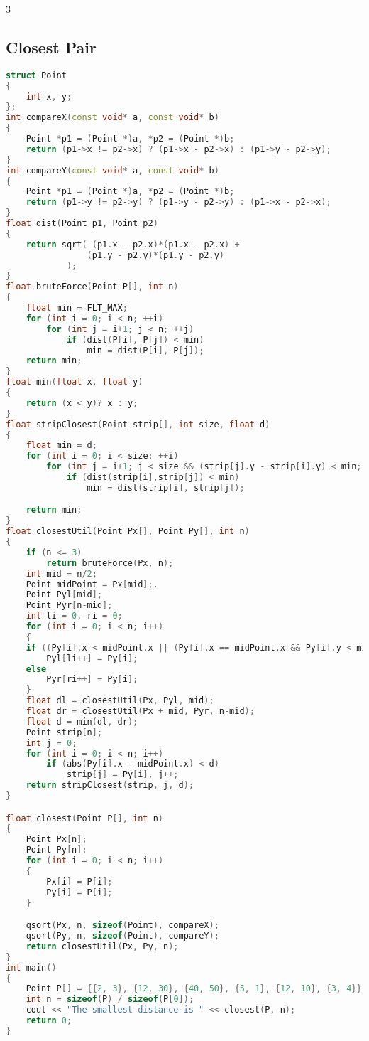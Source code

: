 \documentclass[10pt,a4paper,landscape]{article}
\begin{document}
\begin{multicols}{3}
\subsection{Closest Pair}
\begin{lstlisting}[language=C++, breaklines=true]
struct Point
{
    int x, y;
};
int compareX(const void* a, const void* b)
{
    Point *p1 = (Point *)a, *p2 = (Point *)b;
    return (p1->x != p2->x) ? (p1->x - p2->x) : (p1->y - p2->y);
}
int compareY(const void* a, const void* b)
{
    Point *p1 = (Point *)a, *p2 = (Point *)b;
    return (p1->y != p2->y) ? (p1->y - p2->y) : (p1->x - p2->x);
}
float dist(Point p1, Point p2)
{
    return sqrt( (p1.x - p2.x)*(p1.x - p2.x) +
                (p1.y - p2.y)*(p1.y - p2.y)
            );
}
float bruteForce(Point P[], int n)
{
    float min = FLT_MAX;
    for (int i = 0; i < n; ++i)
        for (int j = i+1; j < n; ++j)
            if (dist(P[i], P[j]) < min)
                min = dist(P[i], P[j]);
    return min;
}
float min(float x, float y)
{
    return (x < y)? x : y;
}
float stripClosest(Point strip[], int size, float d)
{
    float min = d;
    for (int i = 0; i < size; ++i)
        for (int j = i+1; j < size && (strip[j].y - strip[i].y) < min; ++j)
            if (dist(strip[i],strip[j]) < min)
                min = dist(strip[i], strip[j]);

    return min;
}
float closestUtil(Point Px[], Point Py[], int n)
{
    if (n <= 3)
        return bruteForce(Px, n);
    int mid = n/2;
    Point midPoint = Px[mid];.
    Point Pyl[mid];
    Point Pyr[n-mid];
    int li = 0, ri = 0;
    for (int i = 0; i < n; i++)
    {
    if ((Py[i].x < midPoint.x || (Py[i].x == midPoint.x && Py[i].y < midPoint.y)) && li<mid)
        Pyl[li++] = Py[i];
    else
        Pyr[ri++] = Py[i];
    }
    float dl = closestUtil(Px, Pyl, mid);
    float dr = closestUtil(Px + mid, Pyr, n-mid);
    float d = min(dl, dr);
    Point strip[n];
    int j = 0;
    for (int i = 0; i < n; i++)
        if (abs(Py[i].x - midPoint.x) < d)
            strip[j] = Py[i], j++;
    return stripClosest(strip, j, d);
}

float closest(Point P[], int n)
{
    Point Px[n];
    Point Py[n];
    for (int i = 0; i < n; i++)
    {
        Px[i] = P[i];
        Py[i] = P[i];
    }

    qsort(Px, n, sizeof(Point), compareX);
    qsort(Py, n, sizeof(Point), compareY);
    return closestUtil(Px, Py, n);
}
int main()
{
    Point P[] = {{2, 3}, {12, 30}, {40, 50}, {5, 1}, {12, 10}, {3, 4}};
    int n = sizeof(P) / sizeof(P[0]);
    cout << "The smallest distance is " << closest(P, n);
    return 0;
}
\end{lstlisting}


\end{multicols}
\end{document}
